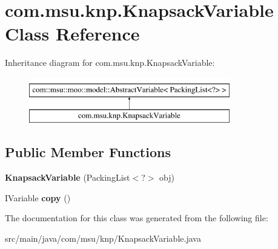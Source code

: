 \hypertarget{classcom_1_1msu_1_1knp_1_1KnapsackVariable}{\section{com.\-msu.\-knp.\-Knapsack\-Variable Class Reference}
\label{classcom_1_1msu_1_1knp_1_1KnapsackVariable}
}
Inheritance diagram for com.\-msu.\-knp.\-Knapsack\-Variable\-:\begin{figure}[H]
\begin{center}
\leavevmode
\includegraphics[height=2.000000cm]{classcom_1_1msu_1_1knp_1_1KnapsackVariable}
\end{center}
\end{figure}
\subsection*{Public Member Functions}
\begin{DoxyCompactItemize}
\item 
\hypertarget{classcom_1_1msu_1_1knp_1_1KnapsackVariable_aab3b919cf394606d5fe7a1e5744d43e0}{{\bfseries Knapsack\-Variable} (Packing\-List$<$?$>$ obj)}\label{classcom_1_1msu_1_1knp_1_1KnapsackVariable_aab3b919cf394606d5fe7a1e5744d43e0}

\item 
\hypertarget{classcom_1_1msu_1_1knp_1_1KnapsackVariable_a3b82219f632fa6a63a15790c151d1504}{I\-Variable {\bfseries copy} ()}\label{classcom_1_1msu_1_1knp_1_1KnapsackVariable_a3b82219f632fa6a63a15790c151d1504}

\end{DoxyCompactItemize}


The documentation for this class was generated from the following file\-:\begin{DoxyCompactItemize}
\item 
src/main/java/com/msu/knp/Knapsack\-Variable.\-java\end{DoxyCompactItemize}
